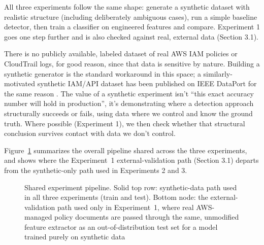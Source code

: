 \documentclass[11pt,a4paper]{article}
\begin{document}
All three experiments follow the same shape: generate a synthetic dataset with realistic structure (including deliberately ambiguous cases), run a simple baseline detector, then train a classifier on engineered features and compare. Experiment 1 goes one step further and is also checked against real, external data (Section 3.1).

There is no publicly available, labeled dataset of real AWS IAM policies or CloudTrail logs, for good reason, since that data is sensitive by nature. Building a synthetic generator is the standard workaround in this space; a similarly-motivated synthetic IAM/API dataset has been published on IEEE DataPort for the same reason \cite{ieeedataport}. The value of a synthetic experiment isn't ``this exact accuracy number will hold in production'', it's demonstrating where a detection approach structurally succeeds or fails, using data where we control and know the ground truth. Where possible (Experiment 1), we then check whether that structural conclusion survives contact with data we don't control.

Figure~\ref{fig:pipeline} summarizes the overall pipeline shared across the three experiments, and shows where the Experiment~1 external-validation path (Section 3.1) departs from the synthetic-only path used in Experiments 2 and 3.

\begin{figure}[h]
\centering
{}
\caption{Shared experiment pipeline. Solid top row: synthetic-data path used in all three experiments (train and test). Bottom node: the external-validation path used only in Experiment~1, where real AWS-managed policy documents are passed through the same, unmodified feature extractor as an out-of-distribution test set for a model trained purely on synthetic data}
\label{fig:pipeline}
\end{figure}
\end{document}
